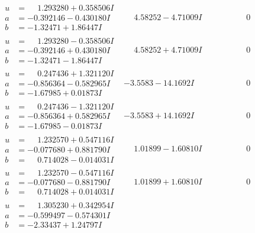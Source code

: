 \documentclass[1p]{elsarticle_modified}
\theoremstyle{definition}
\begin{document}
$$\begin{array}{c|c|c}
\begin{aligned}
u &= \phantom{-}1.293280 + 0.358506 I \\
a &= -0.392146 - 0.430180 I \\
b &= -1.32471 + 1.86447 I\end{aligned}
 & \phantom{-}4.58252 - 4.71009 I & \phantom{-0.000000 } 0 \\ \hline\begin{aligned}
u &= \phantom{-}1.293280 - 0.358506 I \\
a &= -0.392146 + 0.430180 I \\
b &= -1.32471 - 1.86447 I\end{aligned}
 & \phantom{-}4.58252 + 4.71009 I & \phantom{-0.000000 } 0 \\ \hline\begin{aligned}
u &= \phantom{-}0.247436 + 1.321120 I \\
a &= -0.856364 - 0.582965 I \\
b &= -1.67985 + 0.01873 I\end{aligned}
 & -3.5583 - 14.1692 I & \phantom{-0.000000 } 0 \\ \hline\begin{aligned}
u &= \phantom{-}0.247436 - 1.321120 I \\
a &= -0.856364 + 0.582965 I \\
b &= -1.67985 - 0.01873 I\end{aligned}
 & -3.5583 + 14.1692 I & \phantom{-0.000000 } 0 \\ \hline\begin{aligned}
u &= \phantom{-}1.232570 + 0.547116 I \\
a &= -0.077680 + 0.881790 I \\
b &= \phantom{-}0.714028 - 0.014031 I\end{aligned}
 & \phantom{-}1.01899 - 1.60810 I & \phantom{-0.000000 } 0 \\ \hline\begin{aligned}
u &= \phantom{-}1.232570 - 0.547116 I \\
a &= -0.077680 - 0.881790 I \\
b &= \phantom{-}0.714028 + 0.014031 I\end{aligned}
 & \phantom{-}1.01899 + 1.60810 I & \phantom{-0.000000 } 0 \\ \hline\begin{aligned}
u &= \phantom{-}1.305230 + 0.342954 I \\
a &= -0.599497 - 0.574301 I \\
b &= -2.33437 + 1.24797 I\end{aligned}

\end{array}$$
\end{document}
